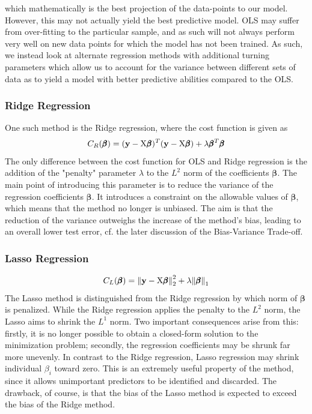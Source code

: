 \documentclass[reprint, english, nofootinbib]{revtex4-2}
\begin{document}
            which mathematically is the best projection of the data-points to our model. However, this may not actually yield the best predictive model. OLS may suffer from over-fitting to the particular sample, and as such will not always perform very well on new data points for which the model has not been trained. As such, we instead look at alternate regression methods with additional turning parameters which allow us to account for the variance between different sets of data as to yield a model with better predictive abilities compared to the OLS.

        \subsubsection{Ridge Regression}
            \noindent
            One such method is the Ridge regression, where the cost function is given as
            \begin{equation}
                C_{R}(\pmb \beta)
                = (\mathbf y - \textup{X}\pmb\beta)^T(\mathbf y - \textup{X}\pmb\beta)
                + \lambda \pmb\beta^T\pmb\beta
            \end{equation}
            The only difference between the cost function for OLS and Ridge regression is the addition of the "penalty" parameter $\lambda$ to the $L^2$ norm of the coefficients $\pmb{\beta}$. The main point of introducing this parameter is to reduce the variance of the regression coefficients $\pmb{\beta}$. It introduces a constraint on the allowable values of $\pmb{\beta}$, which means that the method no longer is unbiased. The aim is that the reduction of the variance outweighs the increase of the method's bias, leading to an overall lower test error, cf. the later discussion of the Bias-Variance Trade-off.
        \subsubsection{Lasso Regression}
            \begin{equation}
                C_L(\pmb \beta) =
                \norm{\mathbf y - \textup{X}\pmb{\beta}}_2^2
                + \lambda\norm{\pmb{\beta}}_1
            \end{equation}
           The Lasso method is distinguished from the Ridge regression by which norm of $\pmb{\beta}$ is penalized. While the Ridge regression applies the penalty to the $L^2$ norm, the Lasso aims to shrink the $L^1$ norm. Two important consequences arise from this: firstly, it is no longer possible to obtain a closed-form solution to the minimization problem; secondly, the regression coefficients may be shrunk far more unevenly. In contrast to the Ridge regression, Lasso regression may shrink individual $\beta_{i}$ toward zero. This is an extremely useful property of the method, since it allows unimportant predictors to be identified and discarded. The drawback, of course, is that the bias of the Lasso method is expected to exceed the bias of the Ridge method.
\end{document}
